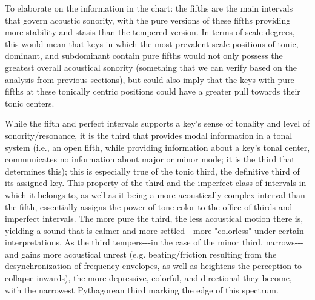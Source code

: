     To elaborate on the information in the chart: the fifths are the main
intervals that govern acoustic sonority, with the pure versions of these
fifths providing more stability and stasis than the tempered version. In
terms of scale degrees, this would mean that keys in which the most
prevalent scale positions of tonic, dominant, and subdominant contain
pure fifths would not only possess the greatest overall acoustical
sonority (something that we can verify based on the analysis from
previous sections), but could also imply that the keys with pure fifths
at these tonically centric positions could have a greater pull towards
their tonic centers.

While the fifth and perfect intervals supports a key's sense of tonality
and level of sonority/resonance, it is the third that provides modal
information in a tonal system (i.e., an open fifth, while providing
information about a key's tonal center, communicates no information
about major or minor mode; it is the third that determines this); this
is especially true of the tonic third, the definitive third of its
assigned key. This property of the third and the imperfect class of
intervals in which it belongs to, as well as it being a more
acoustically complex interval than the fifth, essentially assigns the
power of tone color to the office of thirds and imperfect intervals. The
more pure the third, the less acoustical motion there is, yielding a
sound that is calmer and more settled-\/-\/-more "colorless" under
certain interpretations. As the third tempers-\/-\/-in the case of the
minor third, narrows-\/-\/-and gains more acoustical unrest (e.g.
beating/friction resulting from the desynchronization of frequency
envelopes, as well as heightens the perception to collapse inwards), the
more depressive, colorful, and directional they become, with the
narrowest Pythagorean third marking the edge of this spectrum.

